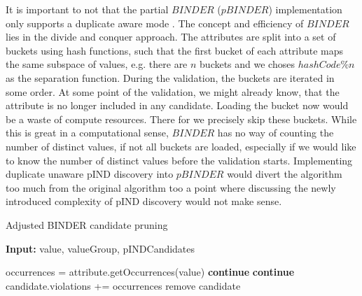 It is important to not that the partial $BINDER$ ($pBINDER$) implementation only supports a duplicate aware mode %
. The concept and efficiency of $BINDER$ lies in the divide and conquer approach. The attributes are split into a set of buckets using hash functions, such that the first bucket of each attribute maps the same subspace of values, e.g. there are $n$ buckets and we choses $hashCode \% n$ as the separation function. During the validation, the buckets are iterated in some order. At some point of the validation, we might already know, that the attribute is no longer included in any candidate. Loading the bucket now would be a waste of compute resources. There for we precisely skip these buckets. While this is great in a computational sense, $BINDER$ has no way of counting the number of distinct values, if not all buckets are loaded, especially if we would like to know the number of distinct values before the validation starts. Implementing duplicate unaware pIND discovery into $pBINDER$ would divert the algorithm too much from the original algorithm too a point where discussing the newly introduced complexity of pIND discovery would not make sense.



\begin{algorithm}
    \caption{Adjusted BINDER candidate pruning}\label{alg:BINDER_prune}
    \hspace*{\algorithmicindent} \textbf{Input:} value, valueGroup, pINDCandidates
    \begin{algorithmic}[1]
        \State occurrences = attribute.getOccurrences(value)
                \State \textbf{continue}
            \EndIf
                \State \textbf{continue}
            \EndIf
            \State candidate.violations += occurrences
                \State remove candidate
            \EndIf
        \EndFor
    \EndFor
    \end{algorithmic}
\end{algorithm}




